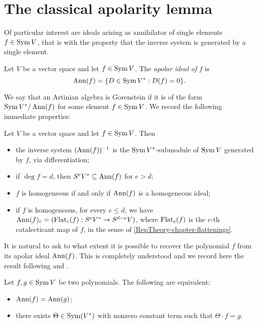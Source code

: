 \section{The classical apolarity lemma}
\label{apolarity-section-apolarityLemma}

Of particular interest are ideals arising as annihilator of single elements $f \in \operatorname{Sym} V$, that is with the property that the inverse system is generated by a single element. 

\begin{definition}
\label{apolarity-definition-apolarIdeal}
Let $V$ be a vector space and let $f \in \operatorname{Sym} V$. The {\it apolar ideal of} $f$ is
\[
\operatorname{Ann}(f) = \{ D \in \operatorname{Sym} V^* : D (f) = 0 \}.
\]
\end{definition}
We say that an Artinian algebra is Gorenstein if it is of the form $\operatorname{Sym} V^* / \operatorname{Ann}(f)$ for some element $f \in \operatorname{Sym} V$.  We record the following immediate properties:

\begin{lemma}
\label{apolarity-definition-apolarIdealBasics}
Let $V$ be a vector space and let $f \in \operatorname{Sym} V$. Then
\begin{itemize}
\item the inverse system $(\operatorname{Ann}(f))^{-1}$ is the $\operatorname{Sym} V^*$-submodule of $\operatorname{Sym} V$ generated by $f$, via differentiation;
 \item if $\deg f = d$, then $S^e V^* \subseteq \operatorname{Ann}(f)$ for $e > d$;
\item $f$ is homogeneous if and only if $\operatorname{Ann}(f)$ is a homogeneous ideal;
\item if $f$ is homogeneous, for every $e \leq d$, we have $\operatorname{Ann}(f)_e = (\mathrm{Flat}_e(f) : S^e V^* \to S^{d-e} V)$, where $\mathrm{Flat}_e(f)$ is the $e$-th catalecticant map of $f$, in the sense of \ref{RepTheory-chapter-flattenings}.
\end{itemize}
\end{lemma}
It is natural to ask to what extent it is possible to recover the polynomial $f$ from its apolar ideal $\operatorname{Ann}(f)$. This is completely understood and we record here the result following \cite[Lemma 3.33A]{IE78} and \cite[Prop. 2.14]{Jel17}.

\begin{proposition}
\label{apolarity-proposition-sameApolar}
 Let $f,g \in \operatorname{Sym} V$ be two polynomials. The following are equivalent:
 \begin{itemize}
  \item $\operatorname{Ann}(f) = \operatorname{Ann}(g)$;
  \item there exists $\Theta \in \operatorname{Sym}(V^*)$ with nonzero constant term such that $\Theta \cdot f = g$. 
 \end{itemize}
\end{proposition}

